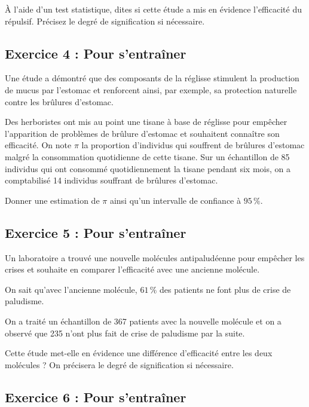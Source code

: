 \documentclass{article}
\numberwithin{equation}{section}
\begin{document}
À l'aide d'un test statistique, dites si cette étude a mis en évidence l'efficacité du répulsif.
Précisez le degré de signification si nécessaire. \\

\bigskip 


\subsection*{ Exercice 4 : Pour s'entraîner}
Une étude a démontré que des composants de la réglisse stimulent la production de mucus par l’estomac et  renforcent ainsi, par exemple, sa protection naturelle contre les brûlures d'estomac. 

Des herboristes ont mis au point une tisane à base de réglisse pour empêcher l'apparition de problèmes de brûlure d'estomac et souhaitent connaître son efficacité. 
On note $\pi$ la proportion d'individus qui souffrent de brûlures d'estomac malgré la consommation
quotidienne de cette tisane.
Sur un échantillon de 85 individus qui ont consommé quotidiennement la tisane pendant six mois, on a comptabilisé 14 individus souffrant de brûlures d'estomac.

Donner une estimation de $\pi$ ainsi qu'un intervalle de confiance à $95\,\%$.\\

\bigskip 

\subsection*{ Exercice 5 : Pour s'entraîner}
Un laboratoire a trouvé une nouvelle molécules antipaludéenne pour empêcher les crises et souhaite en 
comparer l'efficacité avec une ancienne molécule.

On sait qu'avec l'ancienne molécule, $61\,\%$ des patients ne font plus de crise de paludisme. 

On a traité un échantillon de 367 patients avec la nouvelle molécule et on a observé que 235 n’ont 
plus fait de crise de paludisme par la suite.

Cette étude met-elle en évidence une différence d'efficacité entre les deux molécules ? 
On précisera le degré de signification si nécessaire. \\


\bigskip 

\subsection*{ Exercice 6 : Pour s'entraîner} 
\end{document}
